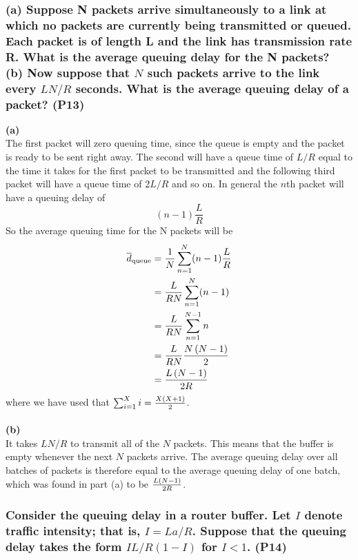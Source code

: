 \subsubsection{(a) Suppose N packets arrive simultaneously to a link at which no packets are currently being transmitted or queued. Each packet is of length L and the link has transmission rate R. What is the average queuing delay for the N packets? \\
(b) Now suppose that $N$ such packets arrive to the link every $LN/R$ seconds. What is the average queuing delay of a packet? (P13)}

\textbf{(a)}\\
The first packet will zero queuing time, since the queue is empty and the packet is ready to be sent right away. The second will have a queue time of $L/R$ equal to the time it takes for the first packet to be transmitted and the following third packet will have a queue time of $2L/R$ and so on. In general the $n$th packet will have a queuing delay of 
\begin{equation*}
    (n - 1) \frac{L}{R}
\end{equation*}
So the average queuing time for the N packets will be
\begin{equation*}
\begin{split}
    \overline{d}_{\text{queue}} &= \frac{1}{N} \sum_{n = 1}^N (n - 1) \frac{L}{R} \\
    &= \frac{L}{RN} \sum_{n = 1}^N (n - 1) \\
    &= \frac{L}{RN} \sum_{n = 1}^{N - 1} n \\
    &= \frac{L}{RN} \frac{N \left (N - 1\right)}{2} \\
    &= \frac{L \left (N - 1\right)}{2R}
\end{split}
\end{equation*}
where we have used that $\sum_{i = 1}^X i = \frac{X \left (X + 1\right)}{2}$. \\
\\
\textbf{(b)}\\
It takes $LN/R$ to transmit all of the $N$ packets. This means that the buffer is empty whenever the next $N$ packets arrive. The average queuing delay over all batches of packets is therefore equal to the average queuing delay of one batch, which was found in part (a) to be $\frac{L \left (N - 1\right)}{2R}$.


\subsubsection{Consider the queuing delay in a router buffer. Let $I$ denote traffic intensity; that is, $I=La/R$. Suppose that the queuing delay takes the form $IL/R (1-I)$ for $I<1$. (P14)}

